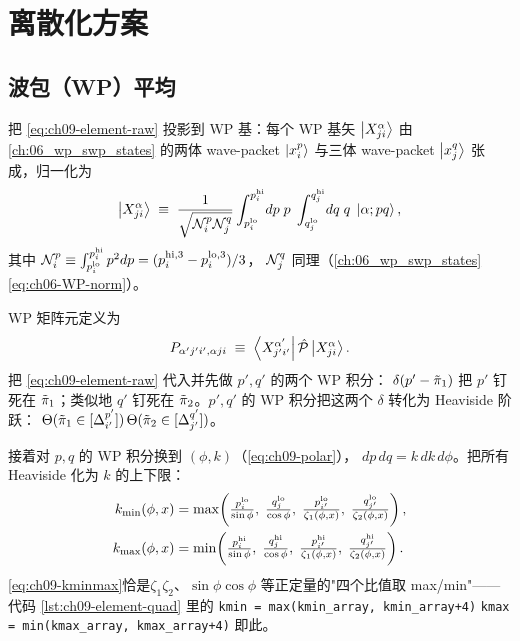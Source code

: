 \section{离散化方案}
\label{sec:ch09-discretization}

\subsection{波包（WP）平均}
\label{subsec:ch09-WP-avg}

把 \eqref{eq:ch09-element-raw} 投影到 WP 基：每个 WP 基矢
\(\ket{X^{\alpha}_{ji}}\) 由 \cref{ch:06_wp_swp_states} 的两体 wave-packet
\(\ket{x_i^p}\) 与三体 wave-packet \(\ket{x_j^q}\) 张成，归一化为
\begin{equation}
\ket{X^{\alpha}_{ji}} \;\equiv\;
\frac{1}{\sqrt{\mathcal{N}^p_i\mathcal{N}^q_j}}
\int_{p_i^{\text{lo}}}^{p_i^{\text{hi}}}\!dp\;p\;
\int_{q_j^{\text{lo}}}^{q_j^{\text{hi}}}\!dq\;q\;
\ket{\alpha; pq},
\end{equation}
其中 \(\mathcal{N}^p_i\equiv \int_{p_i^{\text{lo}}}^{p_i^{\text{hi}}}p^2 dp = (p_i^{\text{hi},3}-p_i^{\text{lo},3})/3\)，
\(\mathcal{N}^q_j\) 同理（\cref{ch:06_wp_swp_states} \eqref{eq:ch06-WP-norm}）。

WP 矩阵元定义为
\begin{equation}
\label{eq:ch09-WP-element}
P_{\alpha' j' i', \alpha j i}
\;\equiv\;
\bra{X^{\alpha'}_{j' i'}}\hat{\mathcal{P}}\ket{X^{\alpha}_{j i}}.
\end{equation}
把 \eqref{eq:ch09-element-raw} 代入并先做 \(p',q'\) 的两个 WP 积分：
\(\delta(p'-\tilde{\pi}_{1})\) 把 \(p'\) 钉死在 \(\tilde{\pi}_{1}\)；类似地 \(q'\) 钉死在
\(\tilde{\pi}_{2}\)。\(p',q'\) 的 WP 积分把这两个 \(\delta\) 转化为 Heaviside 阶跃：
\(\Theta(\tilde{\pi}_{1}\in[\Delta^{p'}_{i'}])\,\Theta(\tilde{\pi}_{2}\in[\Delta^{q'}_{j'}])\)。

接着对 \(p,q\) 的 WP 积分换到 \((\phi,k)\)（\eqref{eq:ch09-polar}），
\(dp\,dq=k\,dk\,d\phi\)。把所有 Heaviside 化为 \(k\) 的上下限：
\begin{align}
k_{\min}(\phi,x)
&= \max\!\left(
\tfrac{p_i^{\text{lo}}}{\sin\phi},\;\tfrac{q_j^{\text{lo}}}{\cos\phi},\;
\tfrac{p_{i'}^{\text{lo}}}{\zeta_1(\phi,x)},\;\tfrac{q_{j'}^{\text{lo}}}{\zeta_2(\phi,x)}
\right),\notag\\
k_{\max}(\phi,x)
&= \min\!\left(
\tfrac{p_i^{\text{hi}}}{\sin\phi},\;\tfrac{q_j^{\text{hi}}}{\cos\phi},\;
\tfrac{p_{i'}^{\text{hi}}}{\zeta_1(\phi,x)},\;\tfrac{q_{j'}^{\text{hi}}}{\zeta_2(\phi,x)}
\right).
\label{eq:ch09-kminmax}
\end{align}
\eqref{eq:ch09-kminmax}恰是\(\zeta_1\zeta_2\)、\(\sin\phi\cos\phi\)
等正定量的"四个比值取 max/min"——代码 \cref{lst:ch09-element-quad}
里的 \verb|kmin = max(kmin_array, kmin_array+4)|
\verb|kmax = min(kmax_array, kmax_array+4)| 即此。

